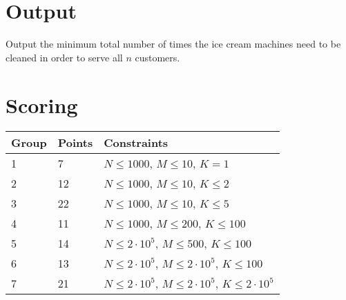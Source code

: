 \section*{Output}
Output the minimum total number of times the ice cream machines need to be
cleaned in order to serve all $n$ customers.

\section*{Scoring}
\begin{tabular}{|l|l|l|}
    \hline
    Group & Points & Constraints \\ \hline
    1     &  7   & $N \leq 1000$,          $M \leq 10$, $K = 1$ \\ \hline %
    2     &  12  & $N \leq 1000$,          $M \leq 10$, $K \leq 2$ \\ \hline %
    3     &  22  & $N \leq 1000$,          $M \leq 10$, $K \leq 5$ \\ \hline %
    4     &  11  & $N \leq 1000$,         $M \leq 200$, $K \leq 100$ \\ \hline %
    5     &  14  & $N \leq 2 \cdot 10^5$, $M \leq 500$, $K \leq 100$ \\ \hline %
    6     &  13  & $N \leq 2 \cdot 10^5$, $M \leq 2 \cdot 10^5$, $K \leq 100$ \\ \hline %
    7     &  21  & $N \leq 2 \cdot 10^5$, $M \leq 2 \cdot 10^5$, $K \leq 2 \cdot 10^5$ \\ \hline %
\end{tabular}

